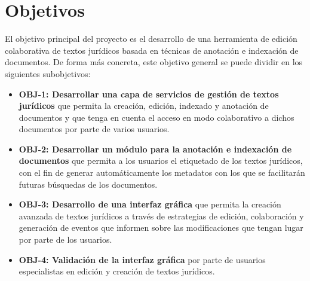 \section{Objetivos}
El objetivo principal del proyecto es el desarrollo de una herramienta de edición colaborativa de textos jurídicos basada en técnicas de anotación e indexación de documentos. De forma más concreta, este objetivo general se puede dividir en los siguientes subobjetivos:
\begin{itemize}
\item {\bf OBJ-1: Desarrollar una capa de servicios de gestión de textos jurídicos} que permita la creación, edición, indexado y anotación de documentos y que tenga en cuenta el acceso en modo colaborativo a dichos documentos por parte de varios usuarios.
\item {\bf OBJ-2: Desarrollar un módulo para la anotación e indexación de documentos} que permita a los usuarios el etiquetado de los textos jurídicos, con el fin de generar automáticamente los metadatos con los que se facilitarán futuras búsquedas de los documentos.
\item {\bf OBJ-3: Desarrollo de una interfaz gráfica} que permita la creación avanzada de textos jurídicos a través de estrategias de edición, colaboración y generación de eventos que informen sobre las modificaciones que tengan lugar por parte de los usuarios.
\item {\bf OBJ-4: Validación de la interfaz gráfica} por parte de usuarios especialistas en edición y creación de textos jurídicos.
\end{itemize}